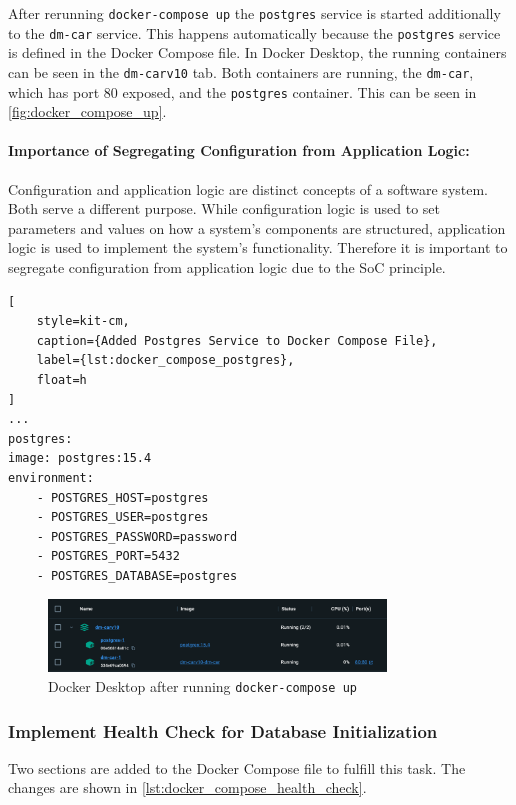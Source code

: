 After rerunning \texttt{docker-compose up} the \texttt{postgres} service is started additionally to the \texttt{dm-car} service.
This happens automatically because the \texttt{postgres} service is defined in the Docker Compose file.
In Docker Desktop, the running containers can be seen in the \texttt{dm-carv10} tab.
Both containers are running, the \texttt{dm-car}, which has port 80 exposed, and the \texttt{postgres} container.
This can be seen in \autoref*{fig:docker_compose_up}.

\paragraph*{Importance of Segregating Configuration from Application Logic:}
Configuration and application logic are distinct concepts of a software system.
Both serve a different purpose.
While configuration logic is used to set parameters and values on how a system's components are structured, application logic is used to implement the system's functionality.
Therefore it is important to segregate configuration from application logic due to the SoC principle.

\begin{lstlisting}[
    style=kit-cm,
    caption={Added Postgres Service to Docker Compose File},
    label={lst:docker_compose_postgres},
    float=h
]
...
postgres:
image: postgres:15.4
environment:
    - POSTGRES_HOST=postgres
    - POSTGRES_USER=postgres
    - POSTGRES_PASSWORD=password
    - POSTGRES_PORT=5432
    - POSTGRES_DATABASE=postgres
\end{lstlisting}

\begin{figure}
    \centering
    \includegraphics[width=0.8\textwidth]{figures/microservices/dmCar/ms_dmCar_dockerComposePostgres.png}
    \caption{Docker Desktop after running \texttt{docker-compose up}}
    \label{fig:docker_compose_up}
\end{figure}

\subsubsection*{Implement Health Check for Database Initialization}
Two sections are added to the Docker Compose file to fulfill this task.
The changes are shown in \autoref*{lst:docker_compose_health_check}.

